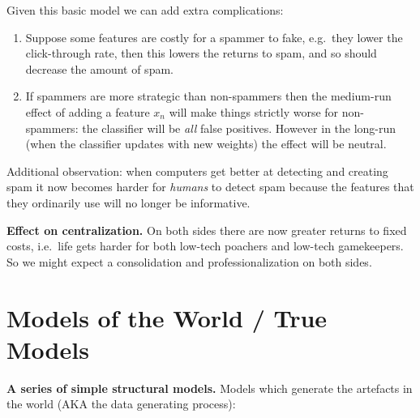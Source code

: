 \documentclass[
  11pt,
  letterpaper,
  DIV=11,
  numbers=noendperiod,
  oneside]{scrartcl}
\begin{document}
Given this basic model we can add extra complications:

\begin{enumerate}
\def\labelenumi{\arabic{enumi}.}
\item
  Suppose some features are costly for a spammer to fake, e.g.~they
  lower the click-through rate, then this lowers the returns to spam,
  and so should decrease the amount of spam.
\item
  If spammers are more strategic than non-spammers then the medium-run
  effect of adding a feature \(x_n\) will make things strictly worse for
  non-spammers: the classifier will be \emph{all} false positives.
  However in the long-run (when the classifier updates with new weights)
  the effect will be neutral.
\end{enumerate}

Additional observation: when computers get better at detecting and
creating spam it now becomes harder for \emph{humans} to detect spam
because the features that they ordinarily use will no longer be
informative.

\textbf{Effect on centralization.} On both sides there are now greater
returns to fixed costs, i.e.~life gets harder for both low-tech poachers
and low-tech gamekeepers. So we might expect a consolidation and
professionalization on both sides.

\hypertarget{models-of-the-world-true-models}{%
\section{Models of the World / True
Models}\label{models-of-the-world-true-models}}

\textbf{A series of simple structural models.} Models which generate the
artefacts in the world (AKA the data generating process):
\end{document}
